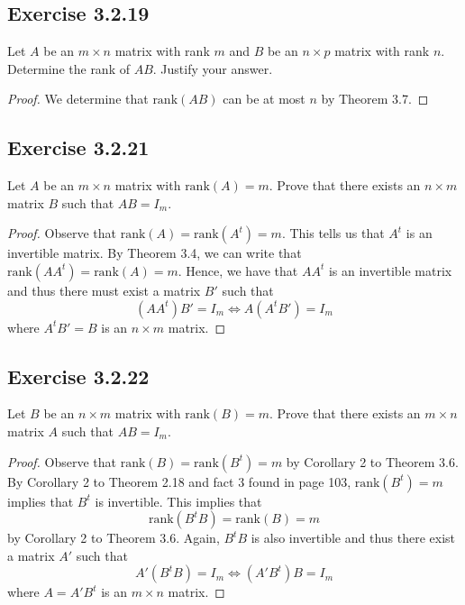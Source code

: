 \subsection*{Exercise 3.2.19} Let \( A  \) be an \( m \times n  \) matrix with rank \(  m  \) and \( B  \) be an \( n \times p  \) matrix with rank \( n  \). Determine the rank of \( AB  \). Justify your answer.
\begin{proof}
    We determine that \( \text{rank}(AB)   \) can be at most \( n  \) by Theorem 3.7. 
\end{proof}

\subsection*{Exercise 3.2.21} Let \( A  \) be an \( m \times n  \) matrix with \( \text{rank}(A) = m  \). Prove that there exists an \( n \times m  \) matrix \( B  \) such that \( AB = {I}_{m} \).
\begin{proof}
Observe that \( \text{rank}(A) = \text{rank}(A^{t}) = m  \). This tells us that \( A^{t} \) is an invertible matrix. By Theorem 3.4, we can write that \( \text{rank}(A A^{t}) = \text{rank}(A) = m \). Hence, we have that \( AA^{t}  \) is an invertible matrix and thus there must exist a matrix \( B'  \) such that 
\[  (A A^{t})B' = {I}_{m} \iff A (A^{t} B') = {I}_{m} \]
where \( A^{t} B' = B   \) is an \( n \times m  \) matrix.
\end{proof}

\subsection*{Exercise 3.2.22} Let \( B  \) be an \( n \times m  \) matrix with \( \text{rank}(B) = m  \). Prove that there exists an \( m \times n \) matrix \( A  \) such that \( AB = {I}_{m} \).
\begin{proof}
Observe that \( \text{rank}(B) = \text{rank}(B^{t}) = m  \) by Corollary 2 to Theorem 3.6. By Corollary 2 to Theorem 2.18 and fact 3 found in page 103, \( \text{rank}(B^{t}) = m  \) implies that \( B^{t} \) is invertible. This implies that    
\[  \text{rank}(B^{t}B) = \text{rank}(B) = m \]
by Corollary 2 to Theorem 3.6. Again, \( B^{t} B  \) is also invertible and thus there exist a matrix \( A'  \) such that 
\[  A' (B^{t}B) = {I}_{m} \iff (A' B^{t}) B = {I}_{m}  \]
where \( A = A'B^{t}  \) is an \( m \times n  \) matrix.
\end{proof}

